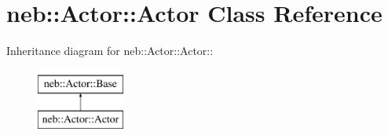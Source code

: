 \hypertarget{classneb_1_1Actor_1_1Actor}{
\section{neb::Actor::Actor Class Reference}
\label{classneb_1_1Actor_1_1Actor}
}
Inheritance diagram for neb::Actor::Actor::\begin{figure}[H]
\begin{center}
\leavevmode
\includegraphics[height=2cm]{classneb_1_1Actor_1_1Actor}
\end{center}
\end{figure}

